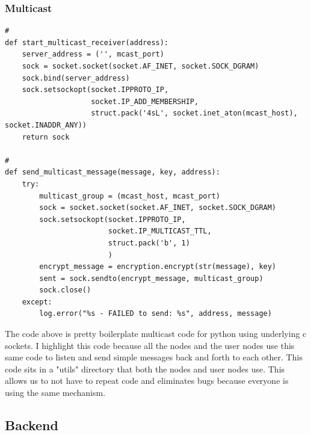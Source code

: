 \documentclass[draftclsnofoot, onecolumn, compsoc, 10pt]{IEEEtran}
\begin{document}
\subsubsection{Multicast}
\begin{lstlisting}
#
def start_multicast_receiver(address):
	server_address = ('', mcast_port)
	sock = socket.socket(socket.AF_INET, socket.SOCK_DGRAM)
	sock.bind(server_address)
	sock.setsockopt(socket.IPPROTO_IP, 
                    socket.IP_ADD_MEMBERSHIP, 
                    struct.pack('4sL', socket.inet_aton(mcast_host), socket.INADDR_ANY))
	return sock

#
def send_multicast_message(message, key, address):
	try:
		multicast_group = (mcast_host, mcast_port)
		sock = socket.socket(socket.AF_INET, socket.SOCK_DGRAM)
		sock.setsockopt(socket.IPPROTO_IP, 
						socket.IP_MULTICAST_TTL, 
						struct.pack('b', 1)
						)
		encrypt_message = encryption.encrypt(str(message), key)
		sent = sock.sendto(encrypt_message, multicast_group)
		sock.close()		
	except:
		log.error("%s - FAILED to send: %s", address, message)
\end{lstlisting}
The code above is pretty boilerplate multicast code for python using underlying c sockets. I highlight this code because all the nodes and the user nodes use this same code to listen and send simple messages back and forth to each other. This code sits in a "utils" directory that both the nodes and user nodes use. This allows us to not have to repeat code and eliminates bugs because everyone is using the same mechanism.

\subsection{Backend}
\end{document}
